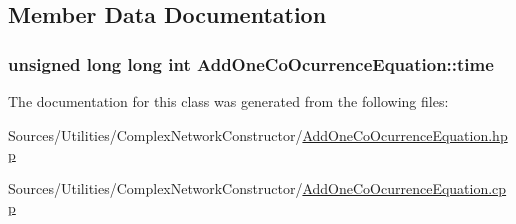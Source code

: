 \subsection{Member Data Documentation}
\hypertarget{class_add_one_co_ocurrence_equation_acc5d13016d7aad2a3937d31552058997}{
\subsubsection[{time}]{\setlength{\rightskip}{0pt plus 5cm}unsigned long long int Add\+One\+Co\+Ocurrence\+Equation\+::time\hspace{0.3cm}{\ttfamily [private]}}}\label{class_add_one_co_ocurrence_equation_acc5d13016d7aad2a3937d31552058997}


The documentation for this class was generated from the following files\+:\begin{DoxyCompactItemize}
\item 
Sources/\+Utilities/\+Complex\+Network\+Constructor/\hyperlink{_add_one_co_ocurrence_equation_8hpp}{Add\+One\+Co\+Ocurrence\+Equation.\+hpp}\item 
Sources/\+Utilities/\+Complex\+Network\+Constructor/\hyperlink{_add_one_co_ocurrence_equation_8cpp}{Add\+One\+Co\+Ocurrence\+Equation.\+cpp}\end{DoxyCompactItemize}
